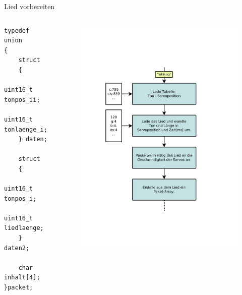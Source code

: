 \begin{frame}[containsverbatim]{Lied vorbereiten}
\begin{columns}
\column{0.49\paperwidth}
\vspace{-1cm}
\begin{lstlisting}
typedef union
{
	struct 
	{
		uint16_t tonpos_ii;
		uint16_t tonlaenge_i;
	} daten;
	
	struct 
	{
		uint16_t tonpos_i;
		uint16_t liedlaenge;
	} daten2;
	
	char inhalt[4];
}packet;
\end{lstlisting}
\column{0.49\paperwidth}
\vspace{-0.5cm}
\begin{figure}
\center
\includegraphics[trim=4cm 3cm 5cm 8cm, clip=true,height=\textheight]{Plots/Diagramm2.pdf}
\end{figure}
\end{columns}
\end{frame}

